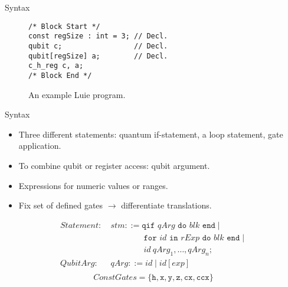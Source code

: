 \begin{frame}[fragile]{Syntax}
\begin{minipage}{.50\textwidth}
\begin{figure}[htp]
\begin{lstlisting}[style=Luie, basicstyle=\ttfamily\large]
/* Block Start */
const regSize : int = 3; // Decl.
qubit c;                 // Decl.
qubit[regSize] a;        // Decl.
c_h_reg c, a;           
/* Block End */
            \end{lstlisting}
            \caption{An example Luie program.}
        \end{figure}
    \end{minipage}
\end{frame}


\newcommand{\adown}{\rotatebox[origin=c]{90}{$\Lsh$}}
\newcommand{\aup}{\rotatebox[origin=c]{90}{$\Rsh$}}
\begin{frame}[fragile]{Syntax}
    \begin{minipage}{.45\textwidth}
        \begin{itemize}
            \item Three different statements: quantum if-statement, a loop statement, gate application.
            \item To combine qubit or register access: qubit argument.
            \item Expressions for numeric values or ranges.
            \item Fix set of defined gates $\to$ differentiate translations.
        \end{itemize}
        \Large
        \begin{align*}
            Statement: \ & stm ::= \texttt{qif } qArg \texttt{ do }  blk \texttt{ end} \mid\\
            & \quad \quad \quad \quad \texttt{for } id \texttt{ in } rExp \texttt{ do } blk \texttt{ end} \mid \\
            & \quad \quad \quad \quad id \ qArg_1, \dots, qArg_n \texttt{;}\\
            QubitArg: \ & qArg ::= id \mid id[exp]\\
    \end{align*}
    \vspace{\alignmargin}
    \begin{equation*}
        ConstGates = \{\texttt{h}, \texttt{x}, \texttt{y}, \texttt{z}, \texttt{cx}, \texttt{ccx}\}
    \end{equation*}

\end{minipage}
\end{frame}
